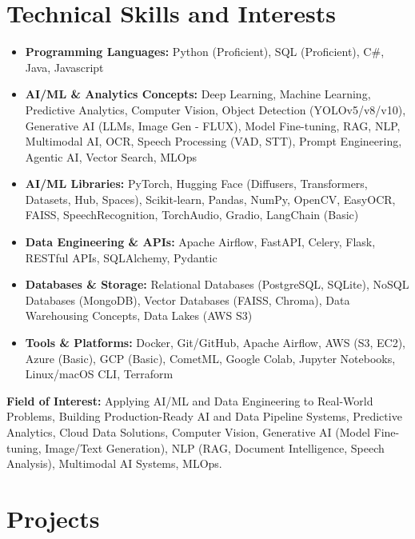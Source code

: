 \documentclass[10pt, a4paper]{article}
\begin{document}
\section{Technical Skills and Interests}

\begin{itemize}[leftmargin=*, itemsep=1pt, topsep=1pt]
    \item \textbf{Programming Languages:} Python (Proficient), SQL (Proficient), C\#, Java, Javascript
    
    \item \textbf{AI/ML \& Analytics Concepts:} Deep Learning, Machine Learning, Predictive Analytics, Computer Vision, Object Detection (YOLOv5/v8/v10), Generative AI (LLMs, Image Gen - FLUX), Model Fine-tuning, RAG, NLP, Multimodal AI, OCR, Speech Processing (VAD, STT), Prompt Engineering, Agentic AI, Vector Search, MLOps
    \item \textbf{AI/ML Libraries:} PyTorch, Hugging Face (Diffusers, Transformers, Datasets, Hub, Spaces), Scikit-learn, Pandas, NumPy, OpenCV, EasyOCR, FAISS, SpeechRecognition, TorchAudio, Gradio, LangChain (Basic)
    \item \textbf{Data Engineering \& APIs:} Apache Airflow, FastAPI, Celery, Flask, RESTful APIs, SQLAlchemy, Pydantic
    \item \textbf{Databases \& Storage:} Relational Databases (PostgreSQL, SQLite), NoSQL Databases (MongoDB), Vector Databases (FAISS, Chroma), Data Warehousing Concepts, Data Lakes (AWS S3)
    \item \textbf{Tools \& Platforms:} Docker, Git/GitHub, Apache Airflow, AWS (S3, EC2), Azure (Basic), GCP (Basic), CometML, Google Colab, Jupyter Notebooks, Linux/macOS CLI, Terraform
\end{itemize}
\vspace{1pt} %
\noindent\textbf{Field of Interest:} Applying AI/ML and Data Engineering to Real-World Problems, Building Production-Ready AI and Data Pipeline Systems, Predictive Analytics, Cloud Data Solutions, Computer Vision, Generative AI (Model Fine-tuning, Image/Text Generation), NLP (RAG, Document Intelligence, Speech Analysis), Multimodal AI Systems, MLOps.

\section{Projects}
\end{document}
